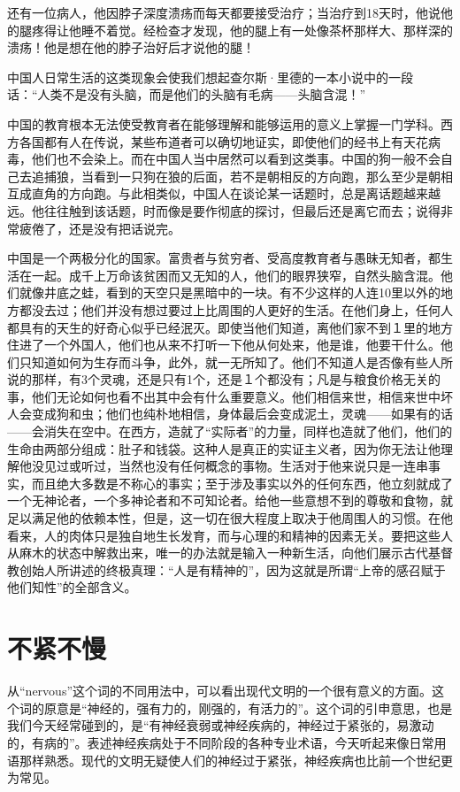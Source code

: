 \documentclass[12pt,oneside]{book}
\begin{document}
\begin{common-format}
还有一位病人，他因脖子深度溃疡而每天都要接受治疗；当治疗到18天时，他说他的腿疼得让他睡不着觉。经检查才发现，他的腿上有一处像茶杯那样大、那样深的溃疡！他是想在他的脖子治好后才说他的腿！ 

中国人日常生活的这类现象会使我们想起查尔斯·里德的一本小说中的一段话：“人类不是没有头脑，而是他们的头脑有毛病——头脑含混！” 

中国的教育根本无法使受教育者在能够理解和能够运用的意义上掌握一门学科。西方各国都有人在传说，某些布道者可以确切地证实，即使他们的经书上有天花病毒，他们也不会染上。而在中国人当中居然可以看到这类事。中国的狗一般不会自己去追捕狼，当看到一只狗在狼的后面，若不是朝相反的方向跑，那么至少是朝相互成直角的方向跑。与此相类似，中国人在谈论某一话题时，总是离话题越来越远。他往往触到该话题，时而像是要作彻底的探讨，但最后还是离它而去；说得非常疲倦了，还是没有把话说完。 

中国是一个两极分化的国家。富贵者与贫穷者、受高度教育者与愚昧无知者，都生活在一起。成千上万命该贫困而又无知的人，他们的眼界狭窄，自然头脑含混。他们就像井底之蛙，看到的天空只是黑暗中的一块。有不少这样的人连10里以外的地方都没去过；他们并没有想过要过上比周围的人更好的生活。在他们身上，任何人都具有的天生的好奇心似乎已经泯灭。即使当他们知道，离他们家不到１里的地方住进了一个外国人，他们也从来不打听一下他从何处来，他是谁，他要干什么。他们只知道如何为生存而斗争，此外，就一无所知了。他们不知道人是否像有些人所说的那样，有3个灵魂，还是只有1个，还是１个都没有；凡是与粮食价格无关的事，他们无论如何也看不出其中会有什么重要意义。他们相信来世，相信来世中坏人会变成狗和虫；他们也纯朴地相信，身体最后会变成泥土，灵魂——如果有的话——会消失在空中。在西方，造就了“实际者”的力量，同样也造就了他们，他们的生命由两部分组成：肚子和钱袋。这种人是真正的实证主义者，因为你无法让他理解他没见过或听过，当然也没有任何概念的事物。生活对于他来说只是一连串事实，而且绝大多数是不称心的事实；至于涉及事实以外的任何东西，他立刻就成了一个无神论者，一个多神论者和不可知论者。给他一些意想不到的尊敬和食物，就足以满足他的依赖本性，但是，这一切在很大程度上取决于他周围人的习惯。在他看来，人的肉体只是独自地生长发育，而与心理的和精神的因素无关。要把这些人从麻木的状态中解救出来，唯一的办法就是输入一种新生活，向他们展示古代基督教创始人所讲述的终极真理：“人是有精神的”，因为这就是所谓“上帝的感召赋于他们知性”的全部含义。 

\chapter{不紧不慢}
从“nervous”这个词的不同用法中，可以看出现代文明的一个很有意义的方面。这个词的原意是“神经的，强有力的，刚强的，有活力的”。这个词的引申意思，也是我们今天经常碰到的，是“有神经衰弱或神经疾病的，神经过于紧张的，易激动的，有病的”。表述神经疾病处于不同阶段的各种专业术语，今天听起来像日常用语那样熟悉。现代的文明无疑使人们的神经过于紧张，神经疾病也比前一个世纪更为常见。 


\end{common-format}
\end{document}
